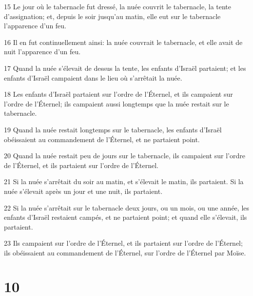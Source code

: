 \par 15 Le jour où le tabernacle fut dressé, la nuée couvrit le tabernacle, la tente d'assignation; et, depuis le soir jusqu'au matin, elle eut sur le tabernacle l'apparence d'un feu.
\par 16 Il en fut continuellement ainsi: la nuée couvrait le tabernacle, et elle avait de nuit l'apparence d'un feu.
\par 17 Quand la nuée s'élevait de dessus la tente, les enfants d'Israël partaient; et les enfants d'Israël campaient dans le lieu où s'arrêtait la nuée.
\par 18 Les enfants d'Israël partaient sur l'ordre de l'Éternel, et ils campaient sur l'ordre de l'Éternel; ils campaient aussi longtemps que la nuée restait sur le tabernacle.
\par 19 Quand la nuée restait longtemps sur le tabernacle, les enfants d'Israël obéissaient au commandement de l'Éternel, et ne partaient point.
\par 20 Quand la nuée restait peu de jours sur le tabernacle, ils campaient sur l'ordre de l'Éternel, et ils partaient sur l'ordre de l'Éternel.
\par 21 Si la nuée s'arrêtait du soir au matin, et s'élevait le matin, ils partaient. Si la nuée s'élevait après un jour et une nuit, ils partaient.
\par 22 Si la nuée s'arrêtait sur le tabernacle deux jours, ou un mois, ou une année, les enfants d'Israël restaient campés, et ne partaient point; et quand elle s'élevait, ils partaient.
\par 23 Ils campaient sur l'ordre de l'Éternel, et ils partaient sur l'ordre de l'Éternel; ils obéissaient au commandement de l'Éternel, sur l'ordre de l'Éternel par Moïse.

\chapter{10}

